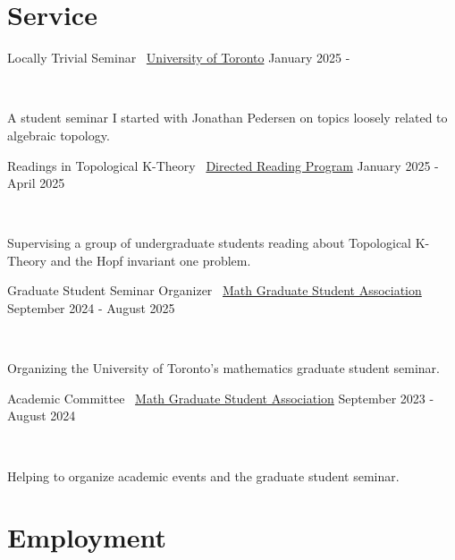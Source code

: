 \documentclass[]{style}
\begin{document}
\section{Service}

\begin{entrylist}

\vspace{1mm}

\entry
{Locally Trivial Seminar \ {\normalfont \underline{University of Toronto}}}
{January 2025 - }
{ ~ \vspace{-2.5mm}

A student seminar I started with Jonathan Pedersen on topics loosely related to algebraic topology.}

\entry
{Readings in Topological K-Theory \ {\normalfont \underline{Directed Reading Program}}}
{January 2025 - April 2025}
{ ~ \vspace{-2.5mm}

Supervising a group of undergraduate students reading about Topological K-Theory and the Hopf invariant one problem.}

\entry
{Graduate Student Seminar Organizer \ {\normalfont \underline{Math Graduate Student Association}}}
{September 2024 - August 2025}
{ ~ \vspace{-2.5mm}

Organizing the University of Toronto's mathematics graduate student seminar.}

\entry
{Academic Committee \ {\normalfont \underline{Math Graduate Student Association}}}
{September 2023 - August 2024}
{ ~ \vspace{-2.5mm}

Helping to organize academic events and the graduate student seminar.}

\end{entrylist}

\newpage

\section{Employment}
\end{document}

